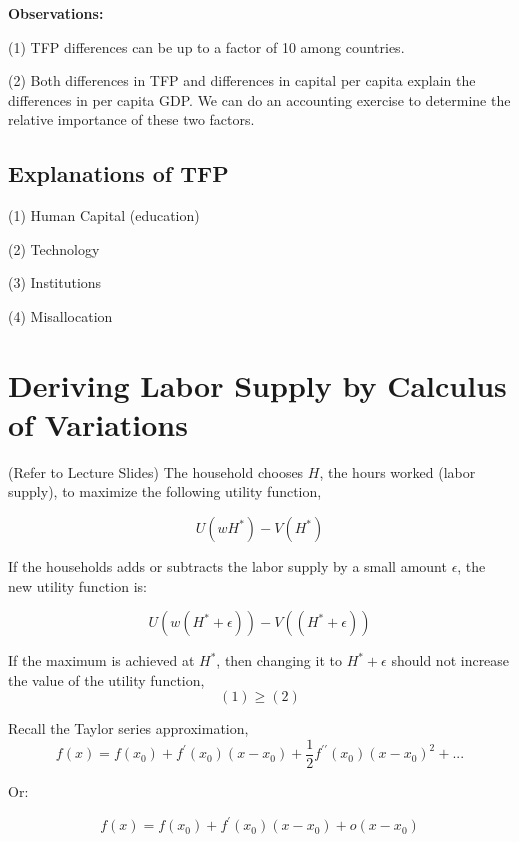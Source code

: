 \documentclass[12pt]{article}
\begin{document}
\textbf{Observations:}

(1) TFP differences can be up to a factor of 10 among countries.

(2) Both differences in TFP and differences in capital per capita explain the differences in per capita GDP. We can do an accounting exercise to determine the relative importance of these two factors.

\subsection{Explanations of TFP}

(1) Human Capital (education)

(2) Technology

(3) Institutions

(4) Misallocation

\section{Deriving Labor Supply by Calculus of Variations}

(Refer to Lecture Slides) The household chooses $H$, the hours worked (labor supply), to maximize the following utility function, 


\begin{equation*}\tag{1}
U({wH}^*) - V ({H}^*) 
\end{equation*}%

If the households adds or subtracts the labor supply by a small amount $\epsilon$, the new utility function is:

\begin{equation*}\tag{2}
U({w({H}^*+\epsilon)}) - V ({({H}^*+\epsilon)}) 
\end{equation*}%

If the maximum is achieved at ${H}^*$, then changing it to ${H}^*+\epsilon$ should not increase the value of the utility function, 
\begin{equation*}\tag{3}
(1) \ge (2) 
\end{equation*}%

Recall the Taylor series approximation, 
\begin{equation*}
f(x)=f(x_{0})+f^{\prime }(x_{0})(x-x_{0})+\frac{1}{2}f^{\prime \prime
}(x_{0})(x-x_{0})^{2}+...
\end{equation*}%

Or:

\begin{equation*}
f(x)=f(x_{0})+f^{\prime }(x_{0})(x-x_{0})+o(x-x_{0})
\end{equation*}%
\end{document}
